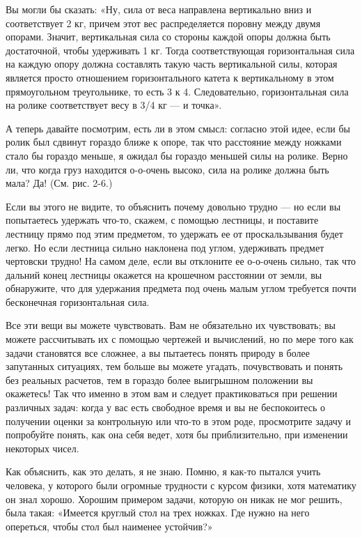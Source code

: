 \documentclass[10pt,oneside]{article}
\newcommand{\TipsRunning}[1]{\par\vspace{2bp}{\centering\footnotesize #1\par}\vspace{2bp}}
\begin{document}
Вы могли бы сказать: «Ну, сила от веса направлена вертикально вниз и соответствует 2 кг, причем этот вес распределяется поровну между двумя опорами. Значит, вертикальная сила со стороны каждой опоры должна быть достаточной, чтобы удерживать 1 кг. Тогда соответствующая горизонтальная сила на каждую опору должна составлять такую часть вертикальной силы, которая является просто отношением горизонтального катета к вертикальному в этом прямоугольном треугольнике, то есть 3 к 4. Следовательно, горизонтальная сила на ролике соответствует весу в 3/4 кг --- и точка».\par

А теперь давайте посмотрим, есть ли в этом смысл: согласно этой идее, если бы ролик был сдвинут гораздо ближе к опоре, так что расстояние между ножками стало бы гораздо меньше, я ожидал бы гораздо меньшей силы на ролике. Верно ли, что когда груз находится о-о-очень высоко, сила на ролике должна быть мала? Да! (См. рис. 2-6.)\par

Если вы этого не видите, то объяснить почему довольно трудно --- но если вы попытаетесь удержать что-то, скажем, с помощью лестницы, и поставите лестницу прямо под этим предметом, то удержать ее от проскальзывания будет легко. Но если лестница сильно наклонена под углом, удерживать предмет чертовски трудно! На самом деле, если вы отклоните ее о-о-очень сильно, так что дальний конец лестницы окажется на крошечном расстоянии от земли, вы обнаружите, что для удержания предмета под очень малым углом требуется почти бесконечная горизонтальная сила.\par

Все эти вещи вы можете чувствовать. Вам не обязательно их чувствовать; вы можете рассчитывать их с помощью чертежей и вычислений, но по мере того как задачи становятся все сложнее, а вы пытаетесь понять природу в более запутанных ситуациях, тем больше вы можете угадать, почувствовать и понять без реальных расчетов, тем в гораздо более выигрышном положении вы окажетесь! Так что именно в этом вам и следует практиковаться при решении различных задач: когда у вас есть свободное время и вы не беспокоитесь о получении оценки за контрольную или что-то в этом роде, просмотрите задачу и попробуйте понять, как она себя ведет, хотя бы приблизительно, при изменении некоторых чисел.\par

\TipsRunning{З А К О Н Ы  И  И Н Т У И Ц И Я \textbackslash{}textbullet\{\} 7 3}

Как объяснить, как это делать, я не знаю. Помню, я как-то пытался учить человека, у которого были огромные трудности с курсом физики, хотя математику он знал хорошо. Хорошим примером задачи, которую он никак не мог решить, была такая: «Имеется круглый стол на трех ножках. Где нужно на него опереться, чтобы стол был наименее устойчив?»\par
\end{document}
